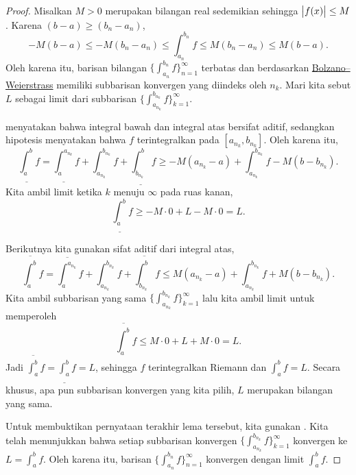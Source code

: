 \begin{proof}
Misalkan $M > 0$ merupakan bilangan real sedemikian sehingga $\bigl\lvert {f(x)} \bigr\rvert \leq M$.
Karena $(b-a) \geq (b_n-a_n)$,
\begin{equation*}
-M(b-a) \leq
-M(b_n-a_n) \leq
\int_{a_n}^{b_n} f
\leq
M(b_n-a_n) \leq
M(b-a) .
\end{equation*}
Oleh karena itu, barisan bilangan
$\bigl\{ \int_{a_n}^{b_n} f \bigr\}_{n=1}^\infty$ terbatas dan berdasarkan
\hyperref[thm:bwseq]{Bolzano--Weierstrass}
memiliki subbarisan konvergen yang diindeks oleh $n_k$.  Mari kita sebut
$L$ sebagai limit dari subbarisan
$\bigl\{ \int_{a_{n_k}}^{b_{n_k}} f \bigr\}_{k=1}^\infty$.

 menyatakan bahwa
integral bawah dan integral atas bersifat aditif,
sedangkan hipotesis menyatakan bahwa
$f$ terintegralkan pada $[a_{n_k},b_{n_k}]$.
Oleh karena itu,
\begin{equation*}
\underline{\int_a^b} f
=
\underline{\int_a^{a_{n_k}}} f
+
\int_{a_{n_k}}^{b_{n_k}} f
+
\underline{\int_{b_{n_k}}^b} f
\geq
-M(a_{n_k}-a)
+
\int_{a_{n_k}}^{b_{n_k}} f
-
M(b-b_{n_k}) .
\end{equation*}
Kita ambil limit ketika $k$ menuju $\infty$ pada ruas kanan,
\begin{equation*}
\underline{\int_a^b} f
\geq
-M\cdot 0
+
L
-
M\cdot 0
= L .
\end{equation*}

Berikutnya kita gunakan sifat aditif dari integral atas,
\begin{equation*}
\overline{\int_a^b} f
=
\overline{\int_a^{a_{n_k}}} f
+
\int_{a_{n_k}}^{b_{n_k}} f
+
\overline{\int_{b_{n_k}}^b} f
\leq
M(a_{n_k}-a)
+
\int_{a_{n_k}}^{b_{n_k}} f
+
M(b-b_{n_k}) .
\end{equation*}
Kita ambil subbarisan yang sama 
$\{ \int_{a_{n_k}}^{b_{n_k}} f \}_{k=1}^\infty$ lalu kita ambil limit 
untuk memperoleh
\begin{equation*}
\overline{\int_a^b} f
\leq
M\cdot 0
+
L
+
M\cdot 0
= L .
\end{equation*}
Jadi $\overline{\int_a^b} f = \underline{\int_a^b} f = L$,
sehingga $f$ terintegralkan Riemann dan $\int_a^b f = L$.
Secara khusus, apa pun
subbarisan konvergen yang kita pilih,
$L$ merupakan bilangan yang sama.

Untuk membuktikan pernyataan terakhir lema tersebut, kita gunakan 
.  Kita telah menunjukkan bahwa setiap
subbarisan konvergen
$\bigl\{ \int_{a_{n_k}}^{b_{n_k}} f \bigr\}_{k=1}^\infty$ konvergen ke $L = \int_a^b f$.
Oleh karena itu, barisan
$\bigl\{ \int_{a_n}^{b_n} f \bigr\}_{n=1}^\infty$ konvergen dengan limit $\int_a^b f$.
\end{proof}

